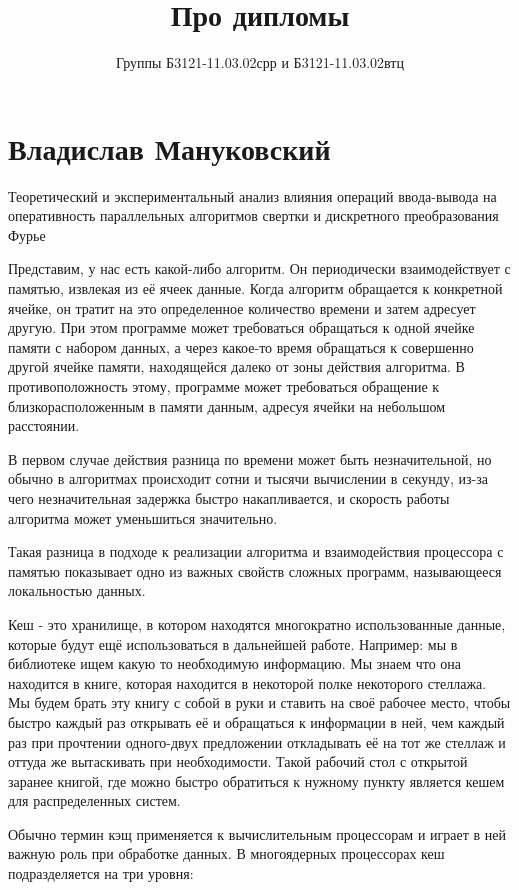 \documentclass[oneside]{book}
\title{Про дипломы}
\author{Группы Б3121-11.03.02срр и Б3121-11.03.02втц}
\let\oldsec\section
\def\section*#1{\oldsec*{#1}\addcontentsline{toc}{section}{#1}}
\begin{document}
\frontmatter
\maketitle
\tableofcontents
\mainmatter

\section*{Владислав Мануковский}

Теоретический и экспериментальный анализ влияния операций ввода-вывода на оперативность параллельных алгоритмов свертки и дискретного преобразования Фурье

Представим, у нас есть какой-либо алгоритм. Он периодически взаимодействует с памятью, извлекая из её ячеек данные.
Когда алгоритм обращается к конкретной ячейке, он тратит на это определенное количество времени и затем адресует другую.
При этом программе может требоваться обращаться к одной ячейке памяти с набором данных, а через какое-то время обращаться к совершенно другой ячейке памяти, находящейся далеко от зоны действия алгоритма.
В противоположность этому, программе может требоваться обращение к близкорасположенным в памяти данным, адресуя ячейки на небольшом расстоянии.

В первом случае действия разница по времени может быть незначительной, но обычно в алгоритмах происходит сотни и тысячи вычислении в секунду, из-за чего незначительная задержка быстро накапливается, и скорость работы алгоритма может уменьшиться значительно.

Такая разница в подходе к реализации алгоритма и взаимодействия процессора с памятью показывает одно из важных свойств сложных программ, называющееся локальностью данных.

Кеш - это хранилище, в котором находятся многократно использованные данные, которые будут ещё использоваться в дальнейшей работе.
Например: мы в библиотеке ищем какую то необходимую информацию. Мы знаем что она находится в книге, которая находится в некоторой полке некоторого стеллажа.
Мы будем брать эту книгу с собой в руки и ставить на своё рабочее место, чтобы быстро каждый раз открывать её и обращаться к информации в ней, чем каждый раз при прочтении одного-двух предложении откладывать её на тот же стеллаж и оттуда же вытаскивать при необходимости.
Такой рабочий стол с открытой заранее книгой, где можно быстро обратиться к нужному пункту является кешем для распределенных систем.

Обычно термин кэщ применяется к вычислительным процессорам и играет в ней важную роль при обработке данных. В многоядерных процессорах кеш подразделяется на три уровня:
\end{document}
